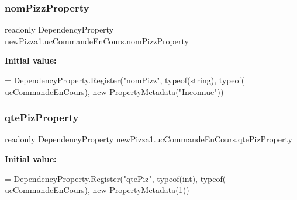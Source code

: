 \subsubsection{\texorpdfstring{nom\+Pizz\+Property}{nomPizzProperty}}
{\footnotesize\ttfamily readonly Dependency\+Property new\+Pizza1.\+uc\+Commande\+En\+Cours.\+nom\+Pizz\+Property\hspace{0.3cm}{\ttfamily [static]}}

{\bfseries Initial value\+:}
\begin{DoxyCode}
=
            DependencyProperty.Register(\textcolor{stringliteral}{"nomPizz"}, typeof(\textcolor{keywordtype}{string}), typeof(
      \hyperlink{classnewPizza1_1_1ucCommandeEnCours_a4076cbc30b75ea9e7894c9688668f616}{ucCommandeEnCours}), \textcolor{keyword}{new} PropertyMetadata(\textcolor{stringliteral}{"Inconnue"}))
\end{DoxyCode}
\mbox{\label{classnewPizza1_1_1ucCommandeEnCours_a0857d9deff2ce24ae9ffb3e1afe77f4e}} 
\subsubsection{\texorpdfstring{qte\+Piz\+Property}{qtePizProperty}}
{\footnotesize\ttfamily readonly Dependency\+Property new\+Pizza1.\+uc\+Commande\+En\+Cours.\+qte\+Piz\+Property\hspace{0.3cm}{\ttfamily [static]}}

{\bfseries Initial value\+:}
\begin{DoxyCode}
=
            DependencyProperty.Register(\textcolor{stringliteral}{"qtePiz"}, typeof(\textcolor{keywordtype}{int}), typeof(
      \hyperlink{classnewPizza1_1_1ucCommandeEnCours_a4076cbc30b75ea9e7894c9688668f616}{ucCommandeEnCours}), \textcolor{keyword}{new} PropertyMetadata(1))
\end{DoxyCode}
\mbox{\label{classnewPizza1_1_1ucCommandeEnCours_aa77da1f21c1745c5bfb12ccda860eaff}} 

